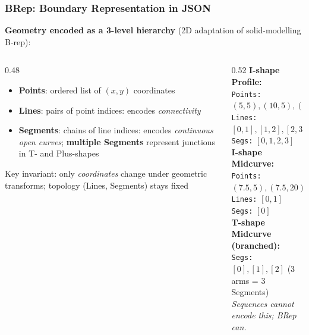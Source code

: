 \begin{frame}[fragile]\frametitle{BRep: Boundary Representation in JSON}

  \textbf{Geometry encoded as a 3-level hierarchy} (2D adaptation of solid-modelling B-rep):

  \begin{columns}[t]
    \begin{column}[T]{0.48\linewidth}
      \begin{itemize}
        \item \textbf{Points}: ordered list of $(x,y)$ coordinates
        \item \textbf{Lines}: pairs of point indices: encodes \textit{connectivity}
        \item \textbf{Segments}: chains of line indices: encodes \textit{continuous open curves}; \textbf{multiple Segments} represent junctions in T- and Plus-shapes
      \end{itemize}
      \vspace{0.5em}
      {\small Key invariant: only \textit{coordinates} change under geometric transforms; topology (Lines, Segments) stays fixed}
    \end{column}
    \begin{column}[T]{0.52\linewidth}
      {\footnotesize\textbf{I-shape Profile:}}\\[0.15em]
      {\footnotesize
        \texttt{Points:} $(5,5),(10,5),(10,20),(5,20)$\\
        \texttt{Lines:}  $[0,1],[1,2],[2,3],[3,0]$\\
        \texttt{Segs:}   $[0,1,2,3]$
      }\\[0.6em]
      {\footnotesize\textbf{I-shape Midcurve:}}\\[0.15em]
      {\footnotesize
        \texttt{Points:} $(7.5,5),(7.5,20)$\\
        \texttt{Lines:}  $[0,1]$\\
        \texttt{Segs:}   $[0]$
      }\\[0.6em]
      {\footnotesize\textbf{T-shape Midcurve (branched):}}\\[0.15em]
      {\footnotesize
        \texttt{Segs:} $[0],[1],[2]$ \quad (3 arms = 3 Segments)\\
        \textit{Sequences cannot encode this; BRep can.}
      }
    \end{column}
  \end{columns}

\end{frame}

